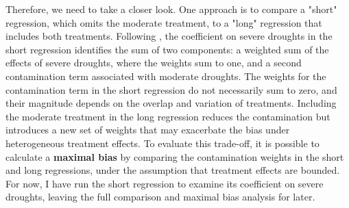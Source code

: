 Therefore, we need to take a closer look. One approach is to compare a "short" regression, which omits the moderate treatment, to a "long" regression that includes both treatments. Following \cite{deChaisemartin2023}, the coefficient on severe droughts in the short regression identifies the sum of two components: a weighted sum of the effects of severe droughts, where the weights sum to one, and a second contamination term associated with moderate droughts. The weights for the contamination term in the short regression do not necessarily sum to zero, and their magnitude depends on the overlap and variation of treatments. Including the moderate treatment in the long regression reduces the contamination but introduces a new set of weights that may exacerbate the bias under heterogeneous treatment effects. To evaluate this trade-off, it is possible to calculate a \textbf{maximal bias} by comparing the contamination weights in the short and long regressions, under the assumption that treatment effects are bounded. For now, I have run the short regression to examine its coefficient on severe droughts, leaving the full comparison and maximal bias analysis for later.